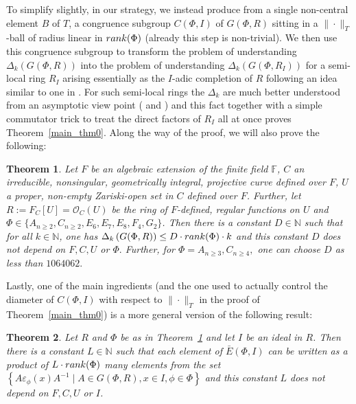 \documentclass[12pt]{amsart}
\newtheorem{theorem}{Theorem}[section]
\theoremstyle{definition}\newtheorem{definition}[theorem]{Definition}
\theoremstyle{remark}\newtheorem{remark}[theorem]{Remark}
\theoremstyle{definition}\newtheorem{case}{Case}
\begin{document}
To simplify slightly, in our strategy, we instead produce from a single non-central element $B$ of $T$, a congruence subgroup $C(\Phi,I)$ of $G(\Phi,R)$ sitting in a $\|\cdot\|_T$-ball of radius linear in ${\rm rank}(\Phi)$ (already this step is non-trivial). We then use this congruence subgroup to transform the problem of understanding $\Delta_k(G(\Phi,R))$ into the problem of understanding $\Delta_k(G(\Phi,R_I))$ for a semi-local ring $R_I$ arising essentially as the $I$-adic completion of $R$ following an idea similar to one in \cite{avni_meiri_2019}. For such semi-local rings the $\Delta_k$ are much better understood from an asymptotic view point (\cite[Theorem~6.3]{KLM} and \cite[Theorem~2]{explicit_strong_bound_sp_2n}) and this fact together with a simple commutator trick to treat the direct factors of $R_I$ all at once proves Theorem~\ref{main_thm0}. Along the way of the proof, we will also prove the following:

\begin{theorem}\label{main_thm1}
Let $F$ be an algebraic extension of the finite field $\mathbb{F}$, $C$ an irreducible, nonsingular, geometrically integral, projective curve defined over $F$, $U$ a proper, non-empty Zariski-open set in $C$ defined over $F$. Further, let $R:=F_C[U]=\mathscr{O}_C(U)$ be the ring of $F$-defined, regular functions on $U$ and $\Phi\in\{A_{n\geq 2},C_{n\geq 2},E_6,E_7,E_8,F_4,G_2\}$. Then there is a constant $D\in\mathbb{N}$ such that for all $k\in\mathbb{N}$, one has $\Delta_k\left(G(\Phi,R)\right)\leq D\cdot{\rm rank}(\Phi)\cdot k$
and this constant $D$ does not depend on $F,C,U$ or $\Phi.$ Further, for $\Phi=A_{n\geq 3},C_{n\geq 4},$ one can choose $D$ as less than $1064062.$ 
\end{theorem}




Lastly, one of the main ingredients (and the one used to actually control the diameter of $C(\Phi,I)$ with respect to $\|\cdot\|_T$ in the proof of Theorem~\ref{main_thm0}) is a more general version of the following result:

\begin{theorem}\label{main_thm2}
Let $R$ and $\Phi$ be as in Theorem~\ref{main_thm1} and let $I$ be an ideal in $R$. Then there is a constant $L\in\mathbb{N}$ such that each element of $\bar{E}(\Phi,I)$ can be written as a product of $L\cdot{\rm rank}(\Phi)$ many elements from the set $\left\{A\varepsilon_{\phi}(x)A^{-1}\mid A\in G(\Phi,R),x\in I,\phi\in\Phi\right\}$ and this constant $L$ does not depend on $F,C,U$ or $I$.
\end{theorem}
\end{document}
